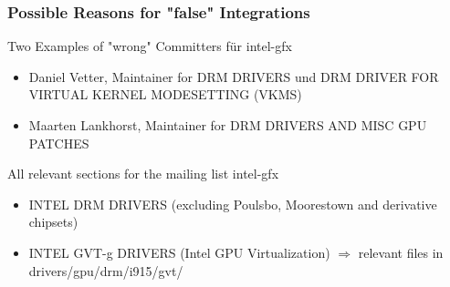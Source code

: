 \documentclass{beamer}
\begin{document}
	\begin{frame}
	\frametitle{Possible Reasons for "false" Integrations}
	\begin{block}{Two Examples of "wrong" Committers für intel-gfx}
		\begin{itemize}
			\item Daniel Vetter, Maintainer for DRM DRIVERS und DRM DRIVER FOR VIRTUAL KERNEL MODESETTING (VKMS)
			\item Maarten Lankhorst, Maintainer for DRM DRIVERS AND MISC GPU PATCHES
		\end{itemize}
	\end{block}
	\begin{block}{All relevant sections for the mailing list intel-gfx}
		\begin{itemize}
			\item INTEL DRM DRIVERS (excluding Poulsbo, Moorestown and derivative chipsets)
			\item INTEL GVT-g DRIVERS (Intel GPU Virtualization) $\Rightarrow$ relevant files in drivers/gpu/drm/i915/gvt/ %
		\end{itemize}
	\end{block}
	\end{frame}
\end{document}
